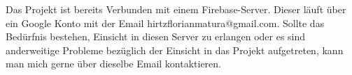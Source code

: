 \documentclass[../main.tex]{subfiles}
\begin{document}
	Das Projekt ist bereits Verbunden mit einem Firebase-Server. Dieser läuft über ein Google Konto mit der Email hirtzflorianmatura@gmail.com. Sollte das Bedürfnis bestehen, Einsicht in diesen Server zu erlangen oder es sind anderweitige Probleme bezüglich der Einsicht in das Projekt aufgetreten, kann man mich gerne über dieselbe Email kontaktieren.
\end{document}
